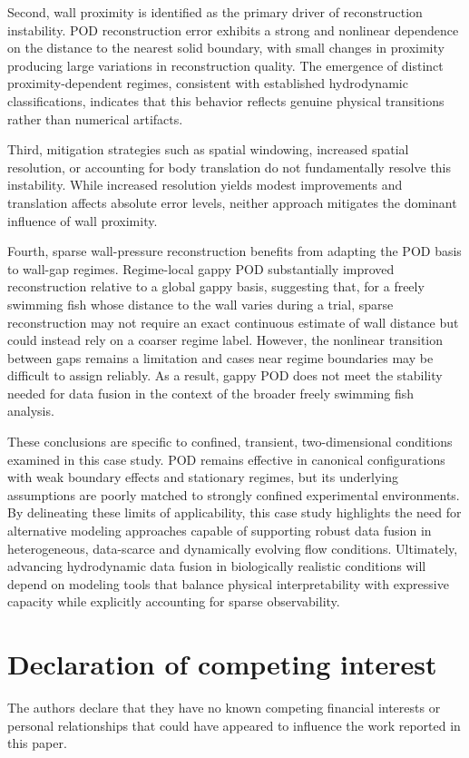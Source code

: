 \documentclass[preprint,12pt]{elsarticle}
\begin{document}
Second, wall proximity is identified as the primary driver of reconstruction instability. POD reconstruction error exhibits a strong and nonlinear dependence on the distance to the nearest solid boundary, with small changes in proximity producing large variations in reconstruction quality. The emergence of distinct proximity-dependent regimes, consistent with established hydrodynamic classifications, indicates that this behavior reflects genuine physical transitions rather than numerical artifacts.

Third, mitigation strategies such as spatial windowing, increased spatial resolution, or accounting for body translation do not fundamentally resolve this instability. While increased resolution yields modest improvements and translation affects absolute error levels, neither approach mitigates the dominant influence of wall proximity.

Fourth, sparse wall-pressure reconstruction benefits from adapting the POD basis to wall-gap regimes. Regime-local gappy POD substantially improved reconstruction relative to a global gappy basis, suggesting that, for a freely swimming fish whose distance to the wall varies during a trial, sparse reconstruction may not require an exact continuous estimate of wall distance but could instead rely on a coarser regime label. However, the nonlinear transition between gaps remains a limitation and cases near regime boundaries may be difficult to assign reliably. As a result, gappy POD does not meet the stability needed for data fusion in the context of the broader freely swimming fish analysis.

These conclusions are specific to confined, transient, two-dimensional conditions examined in this case study. POD remains effective in canonical configurations with weak boundary effects and stationary regimes, but its underlying assumptions are poorly matched to strongly confined experimental environments. By delineating these limits of applicability, this case study highlights the need for alternative modeling approaches capable of supporting robust data fusion in heterogeneous, data-scarce and dynamically evolving flow conditions. Ultimately, advancing hydrodynamic data fusion in biologically realistic conditions will depend on modeling tools that balance physical interpretability with expressive capacity while explicitly accounting for sparse observability.

\section*{Declaration of competing interest}
The authors declare that they have no known competing financial interests or personal relationships that could have appeared to influence the work reported in this paper.
\end{document}

